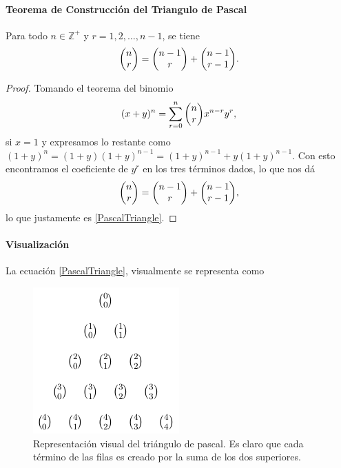 \documentclass[conference]{IEEEtran}
\begin{document}
\paragraph{Teorema de Construcción del Triangulo de Pascal \cite{freund}} Para todo $n \in \mathbb{Z} ^+$  y $r = 1,2,\ldots ,n-1$, se tiene
	\begin{equation}
		\mqty(n \\ r) = \mqty(n - 1 \\ r) + \mqty(n - 1 \\ r - 1). \label{PascalTriangle}
	\end{equation}

\begin{proof}
	Tomando el teorema del binomio
		\begin{equation}
			(x + y)^n = \sum _{r = 0} ^n \mqty(n \\ r) x^{n - r} y^r ,
		\end{equation}
	si $x = 1$ y expresamos lo restante como $(1 + y)^n = (1 + y) (1 + y) ^{n - 1} = (1 + y) ^{n - 1} + y(1 + y)^{n - 1}$. Con esto encontramos el coeficiente de $y^r$ en los tres términos dados, lo que nos dá
		\begin{equation*}
			\mqty(n \\ r) = \mqty(n - 1 \\ r) + \mqty(n - 1 \\ r - 1),
		\end{equation*}
	lo que justamente es \eqref{PascalTriangle}.
\end{proof}

\paragraph{Visualización} 
La ecuación \eqref{PascalTriangle}, visualmente se representa como
	
\begin{figure}[H]
	\centering
	\includegraphics[scale=0.8]{img/triangulo.png}
	\caption{Representación visual del triángulo de pascal. Es claro que cada término de las filas es creado por la suma de los dos superiores.}
	\label{VisualPascalTriangle}
\end{figure}
\end{document}
